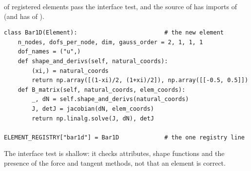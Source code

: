 \newpage\thispagestyle{hl}
\par
{}
\begin{hlheadline}\cdeRegPass{} of \cdeRegTotal{} registered elements pass the interface test, and the source of \fea{} has \cdeFeaImportsRom{} imports of \rom{} (and \rom{} has \cdeRomImportsFea{} of \fea{}).\end{hlheadline}
\begin{lstlisting}[style=hlpy]
class Bar1D(Element):                         # the new element
    n_nodes, dofs_per_node, dim, gauss_order = 2, 1, 1, 1
    dof_names = ("u",)
    def shape_and_derivs(self, natural_coords):
        (xi,) = natural_coords
        return np.array([(1-xi)/2, (1+xi)/2]), np.array([[-0.5, 0.5]])
    def B_matrix(self, natural_coords, elem_coords):
        _, dN = self.shape_and_derivs(natural_coords)
        J, detJ = jacobian(dN, elem_coords)
        return np.linalg.solve(J, dN), detJ

ELEMENT_REGISTRY["bar1d"] = Bar1D             # the one registry line
\end{lstlisting}
\begin{hllimit}The interface test is shallow: it checks attributes, shape functions and the presence of the force and tangent methods, not that an element is correct.\end{hllimit}
